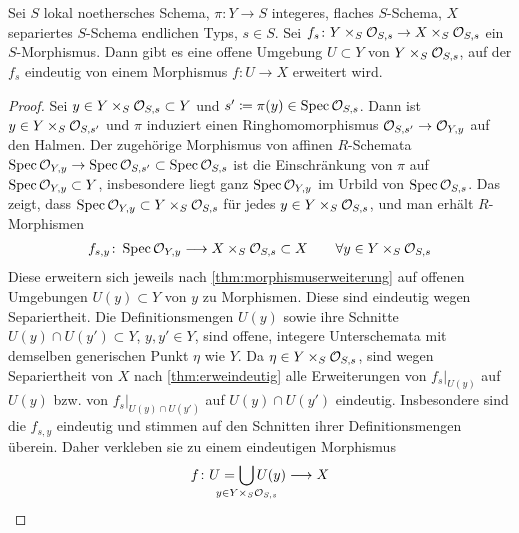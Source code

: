 \documentclass[german]{scrreprt}
\begin{document}
\begin{Korollar}\label{thm:allgmorphismuserweiterung}
  Sei $S$ lokal noethersches Schema,
  $\pi\colon Y\to S$ integeres, flaches $S$-Schema,
  $X$ separiertes $S$-Schema endlichen Typs,
  $s\in S$.
  Sei $f_s\colon Y\times_S\mathcal{O}_{S,s}\to X\times_S\mathcal{O}_{S,s}$ ein
  $S$-Morphismus.
  Dann gibt es eine offene Umgebung $U\subset Y$ von
  $Y\times_S\mathcal{O}_{S,s}$, auf der $f_s$ eindeutig von einem Morphismus
  $f\colon U\to X$ erweitert wird.
  \begin{proof}
    Sei $y\in Y\times_S\mathcal{O}_{S,s}\subset Y$ und
    $s'\coloneqq\pi(y)\in\operatorname{Spec}\mathcal{O}_{S,s}$. Dann ist $y\in
    Y\times_S\mathcal{O}_{S,s'}$ und $\pi$ induziert einen
    Ringhomomorphismus $\mathcal{O}_{S,s'}\to\mathcal{O}_{Y,y}$ auf den Halmen. Der
    zugehörige Morphismus von affinen $R$-Schemata
    $\operatorname{Spec}\mathcal{O}_{Y,y}\to\operatorname{Spec}\mathcal{O}_{S,s'}\subset\operatorname{Spec}\mathcal{O}_{S,s}$ ist die
    Einschränkung von $\pi$ auf $\operatorname{Spec}\mathcal{O}_{Y,y}\subset Y$, insbesondere
    liegt ganz $\operatorname{Spec}\mathcal{O}_{Y,y}$ im Urbild von $\operatorname{Spec}\mathcal{O}_{S,s}$.
    Das zeigt, dass $\operatorname{Spec}\mathcal{O}_{Y,y}\subset Y\times_S\mathcal{O}_{S,s}$ für jedes
    $y\in Y\times_S\mathcal{O}_{S,s}$, und man erhält $R$-Morphismen
    \begin{gather*}
      f_{s,y}\colon \operatorname{Spec}\mathcal{O}_{Y,y}\longrightarrow X\times_S\mathcal{O}_{S,s}\subset X
      \qquad \forall y \in Y\times_S\mathcal{O}_{S,s}
    \end{gather*}
    Diese erweitern sich jeweils nach
    \ref{thm:morphismuserweiterung} auf offenen
    Umgebungen $U(y)\subset Y$ von $y$ zu Morphismen.
    Diese sind eindeutig wegen Separiertheit.
    Die Definitionsmengen $U(y)$ sowie ihre Schnitte $U(y)\cap
    U(y')\subset Y$, $y,y'\in Y$, sind offene, integere
    Unterschemata mit demselben generischen Punkt $\eta$ wie $Y$.
    Da $\eta\in Y\times_S\mathcal{O}_{S,s}$, sind wegen Separiertheit von $X$
    nach \ref{thm:erweindeutig} alle Erweiterungen von 
    $f_s|_{U(y)}$ auf $U(y)$ bzw. von $f_s|_{U(y)\cap U(y')}$ auf
    $U(y)\cap U(y')$ eindeutig.
    Insbesondere sind die $f_{s,y}$ eindeutig und stimmen auf den
    Schnitten ihrer Definitionsmengen überein.
    Daher verkleben sie zu einem eindeutigen Morphismus
    \begin{gather*}
      f\colon U=\bigcup_{\mathclap{y\in Y\times_S\O_{S,s}}} U(y)\longto X
    \end{gather*}
  \end{proof}
\end{Korollar}
\end{document}
